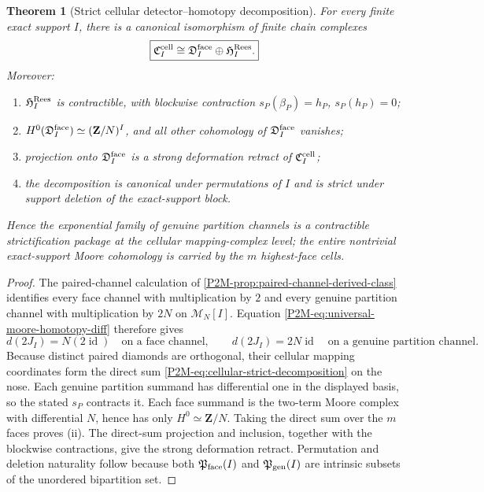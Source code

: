 \documentclass[11pt]{article}
\newtheorem{theorem}{Theorem}[section]
\theoremstyle{remark}
\newcommand{\Z}{\mathbf Z}
\begin{document}
\begin{theorem}[Strict cellular detector--homotopy decomposition]
\label{P2M-thm:cellular-detector-homotopy-decomposition}
For every finite exact support \(I\), there is a canonical isomorphism of finite
chain complexes
\begin{equation}\label{P2M-eq:cellular-strict-decomposition}
 \boxed{
 \mathfrak C_I^{\rm cell}
 \cong
 \mathfrak D_I^{\rm face}\oplus\mathfrak H_I^{\rm Rees}.}
\end{equation}
Moreover:
\begin{enumerate}[label=\textup{(\roman*)}]
\item \(\mathfrak H_I^{\rm Rees}\) is contractible, with blockwise contraction
      \(s_P(\beta_P)=h_P\), \(s_P(h_P)=0\);
\item \(H^0(\mathfrak D_I^{\rm face})\simeq(\Z/N)^I\), and all other
      cohomology of \(\mathfrak D_I^{\rm face}\) vanishes;
\item projection onto \(\mathfrak D_I^{\rm face}\) is a strong deformation
      retract of \(\mathfrak C_I^{\rm cell}\);
\item the decomposition is canonical under permutations of \(I\) and is strict
      under support deletion of the exact-support block.
\end{enumerate}
Hence the exponential family of genuine partition channels is a contractible
strictification package at the cellular mapping-complex level; the entire
nontrivial exact-support Moore cohomology is carried by the \(m\) highest-face
cells.
\end{theorem}

\begin{proof}
The paired-channel calculation of
\cref{P2M-prop:paired-channel-derived-class} identifies every face channel with
multiplication by \(2\) and every genuine partition channel with multiplication
by \(2N\) on \(\mathcal M_N[I]\).  Equation
\eqref{P2M-eq:universal-moore-homotopy-diff} therefore gives
\[
 d(2J_I)=N(2\operatorname{id})
 \quad\text{on a face channel},
 \qquad
 d(2J_I)=2N\operatorname{id}
 \quad\text{on a genuine partition channel}.
\]
Because distinct paired diamonds are orthogonal, their cellular mapping
coordinates form the direct sum
\eqref{P2M-eq:cellular-strict-decomposition} on the nose.  Each genuine partition
summand has differential one in the displayed basis, so the stated \(s_P\)
contracts it.  Each face summand is the two-term Moore complex with differential
\(N\), hence has only \(H^0\simeq\Z/N\).  Taking the direct sum over the \(m\)
faces proves \textup{(ii)}.  The direct-sum projection and inclusion, together
with the blockwise contractions, give the strong deformation retract.
Permutation and deletion naturality follow because both
\(\mathfrak P_{\rm face}(I)\) and \(\mathfrak P_{\rm gen}(I)\) are intrinsic
subsets of the unordered bipartition set.
\end{proof}
\end{document}
